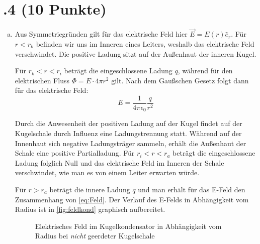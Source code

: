 \section*{\nr.4 \titfour (10 Punkte)}
\begin{enumerate}[(a)]
\item Aus Symmetriegründen gilt für das elektrische Feld hier $\vec{E}=E(r)\hat{e}_r$. Für $r<r_k$ befinden wir uns im Inneren eines Leiters, weshalb das elektrische Feld verschwindet. Die positive Ladung sitzt auf der Außenhaut der inneren Kugel. 

Für $r_k < r < r_i$ beträgt die eingeschlossene Ladung $q$, während für den elektrischen Fluss $\Phi=E\cdot 4\pi r^2$ gilt. Nach dem Gaußschen Gesetz folgt dann für das elektrische Feld:
\begin{equation}
E = \frac{1}{4\pi \epsilon_0} \frac{q}{r^2}
\label{eq:Feld}
\end{equation}

Durch die Anwesenheit der positiven Ladung auf der Kugel findet auf der Kugelschale durch Influenz eine Ladungstrennung statt. Während auf der Innenhaut sich negative Ladungsträger sammeln, erhält die Außenhaut der Schale eine positive Partialladung. Für $r_i < r < r_a$ beträgt die eingeschlossene Ladung folglich Null und das elektrische Feld im Inneren der Schale verschwindet, wie man es von einem Leiter erwarten würde. 

Für $r> r_a$ beträgt die innere Ladung $q$ und man erhält für das E-Feld den Zusammenhang von \vref{eq:Feld}. Der Verlauf des E-Felds in Abhängigkeit vom Radius ist in \vref{fig:feldkond} graphisch aufbereitet.



\begin{figure}[htbp]
\centering
{}
\caption{Elektrisches Feld im Kugelkondensator in Abhängigkeit vom Radius bei \emph{nicht} geerdeter Kugelschale}
\label{fig:feldkond}
\end{figure}


\end{enumerate}
